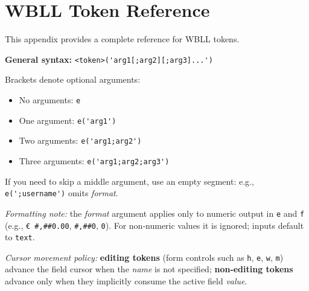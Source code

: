 
\chapter{WBLL Token Reference}
\label{app:wbll-tokens}

This appendix provides a complete reference for WBLL tokens.



\newcommand{\wballsyn}[1]{\lstinline[language=WBLL,basicstyle=\ttfamily\small]!#1!}

\noindent\textbf{General syntax:} \wballsyn{<token>('arg1[;arg2][;arg3]...')}

\noindent Brackets denote optional arguments:
\begin{itemize}
  \item No arguments: \wballsyn{e}
  \item One argument: \wballsyn{e('arg1')}
  \item Two arguments: \wballsyn{e('arg1;arg2')}
  \item Three arguments: \wballsyn{e('arg1;arg2;arg3')}
\end{itemize}
If you need to skip a middle argument, use an empty segment: e.g., \wballsyn{e(';username')} omits \textit{format}.

\par\smallskip
\textit{Formatting note:} the \textit{format} argument applies only to numeric output in \texttt{e} and \texttt{f} (e.g., \texttt{€ \#,\#\#0.00}, \texttt{\#,\#\#0}, \texttt{0}). For non‑numeric values it is ignored; inputs default to \texttt{text}.
\par\smallskip
\textit{Cursor movement policy:} \textbf{editing tokens} (form controls such as \texttt{h}, \texttt{e}, \texttt{w}, \texttt{m}) advance the field cursor when the \emph{name} is not specified; \textbf{non-editing tokens} advance only when they implicitly consume the active field \emph{value}.

